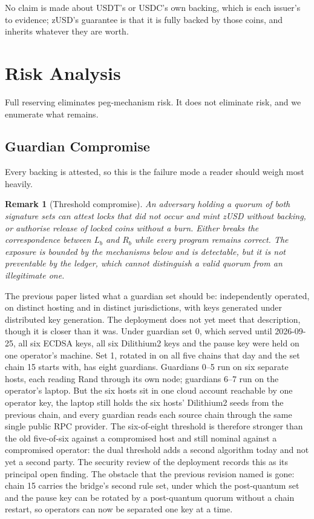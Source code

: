 \documentclass[11pt,a4paper]{article}
\newtheorem{remark}[theorem]{Remark}
\begin{document}
No claim is made about USDT's or USDC's own backing, which is each issuer's to evidence; zUSD's guarantee is that it is fully backed by those coins, and inherits whatever they are worth.

\section{Risk Analysis}
\label{sec:risk}

Full reserving eliminates peg-mechanism risk. It does not eliminate risk, and we enumerate what remains.

\subsection{Guardian Compromise}
\label{sec:guardian}

Every backing is attested, so this is the failure mode a reader should weigh most heavily.

\begin{remark}[Threshold compromise]
An adversary holding a quorum of both signature sets can attest locks that did not occur and mint zUSD without backing, or authorise release of locked coins without a burn. Either breaks the correspondence between $L_b$ and $R_b$ while every program remains correct. The exposure is bounded by the mechanisms below and is detectable, but it is not preventable by the ledger, which cannot distinguish a valid quorum from an illegitimate one.
\end{remark}

The previous paper listed what a guardian set should be: independently operated, on distinct hosting and in distinct jurisdictions, with keys generated under distributed key generation. The deployment does not yet meet that description, though it is closer than it was. Under guardian set 0, which served until 2026-09-25, all six ECDSA keys, all six Dilithium2 keys and the pause key were held on one operator's machine. Set 1, rotated in on all five chains that day and the set chain 15 starts with, has eight guardians. Guardians 0--5 run on six separate hosts, each reading Rand through its own node; guardians 6--7 run on the operator's laptop. But the six hosts sit in one cloud account reachable by one operator key, the laptop still holds the six hosts' Dilithium2 seeds from the previous chain, and every guardian reads each source chain through the same single public RPC provider. The six-of-eight threshold is therefore stronger than the old five-of-six against a compromised host and still nominal against a compromised operator: the dual threshold adds a second algorithm today and not yet a second party. The security review of the deployment records this as its principal open finding. The obstacle that the previous revision named is gone: chain 15 carries the bridge's second rule set, under which the post-quantum set and the pause key can be rotated by a post-quantum quorum without a chain restart, so operators can now be separated one key at a time.
\end{document}
